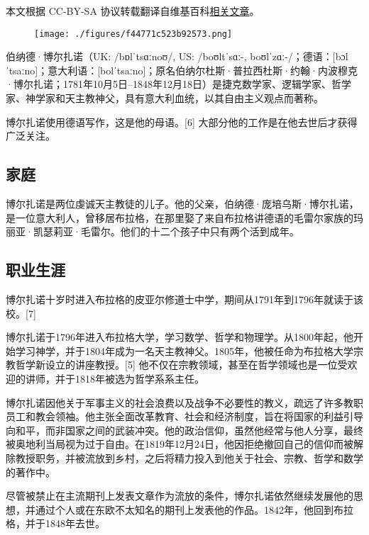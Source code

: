 
本文根据 CC-BY-SA 协议转载翻译自维基百科\href{https://en.wikipedia.org/wiki/Bernard_Bolzano}{相关文章}。

\begin{figure}[ht]
\centering
\texttt{[image: ./figures/f44771c523b92573.png]}
\caption{} \label{fig_Bolzan_1}
\end{figure}
伯纳德·博尔扎诺（UK: /bɒlˈtsɑːnoʊ/, US: /boʊltˈsɑː-, boʊlˈzɑː-/；德语：[bɔlˈtsaːno]；意大利语：[bolˈtsaːno]；原名伯纳尔杜斯·普拉西杜斯·约翰·内波穆克·博尔扎诺；1781年10月5日–1848年12月18日）是捷克数学家、逻辑学家、哲学家、神学家和天主教神父，具有意大利血统，以其自由主义观点而著称。

博尔扎诺使用德语写作，这是他的母语。[6] 大部分他的工作是在他去世后才获得广泛关注。
\subsection{家庭}  
博尔扎诺是两位虔诚天主教徒的儿子。他的父亲，伯纳德·庞培乌斯·博尔扎诺，是一位意大利人，曾移居布拉格，在那里娶了来自布拉格讲德语的毛雷尔家族的玛丽亚·凯瑟莉亚·毛雷尔。他们的十二个孩子中只有两个活到成年。
\subsection{职业生涯}  
博尔扎诺十岁时进入布拉格的皮亚尔修道士中学，期间从1791年到1796年就读于该校。[7]

博尔扎诺于1796年进入布拉格大学，学习数学、哲学和物理学。从1800年起，他开始学习神学，并于1804年成为一名天主教神父。1805年，他被任命为布拉格大学宗教哲学新设立的讲座教授。[5] 他不仅在宗教领域，甚至在哲学领域也是一位受欢迎的讲师，并于1818年被选为哲学系系主任。

博尔扎诺因他关于军事主义的社会浪费以及战争不必要性的教义，疏远了许多教职员工和教会领袖。他主张全面改革教育、社会和经济制度，旨在将国家的利益引导向和平，而非国家之间的武装冲突。他的政治信仰，虽然他经常与他人分享，最终被奥地利当局视为过于自由。在1819年12月24日，他因拒绝撤回自己的信仰而被解除教授职务，并被流放到乡村，之后将精力投入到他关于社会、宗教、哲学和数学的著作中。

尽管被禁止在主流期刊上发表文章作为流放的条件，博尔扎诺依然继续发展他的思想，并通过个人或在东欧不太知名的期刊上发表他的作品。1842年，他回到布拉格，并于1848年去世。